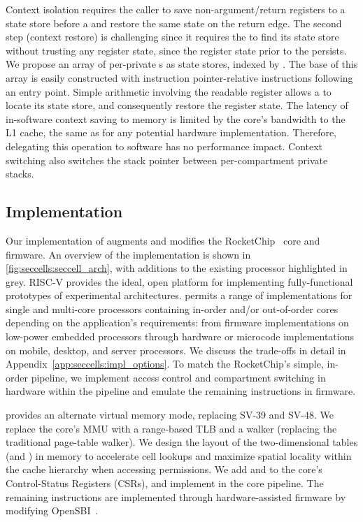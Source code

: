 Context isolation requires the caller to save non-argument/return
registers to a state store before a \sdswitch and restore the same state
on the return edge.
The second step (context restore) is challenging since it
requires the \secdiv to find its state store without trusting any
register state, since the register state prior to the \sdswitch
persists.
We propose an array of per-\secdiv private \cell{}s as 
state stores, indexed by \sid.
The base of this array is easily constructed with
instruction pointer-relative instructions following an entry point.
Simple arithmetic involving the readable \sid register allows
a \secdiv to locate its state store, and consequently restore
the register state.
The latency of in-software context saving to memory is limited by 
the core's bandwidth to the L1 cache, the same as for any potential
hardware implementation.
Therefore, delegating this operation to software has no performance
impact.
Context switching also switches the stack pointer between 
per-compartment private stacks.

\subsection{Implementation}
\label{sec:seccells:impl}

Our implementation of \seccells augments and modifies the 
RocketChip~\cite{RocketChip} core and firmware.
An overview of the implementation is shown in 
\autoref{fig:seccells:seccell_arch}, with additions to the existing
processor highlighted in grey.
RISC-V provides the ideal, open platform for implementing fully-functional
prototypes of experimental architectures. 
\seccells permits a range of implementations for single and multi-core
processors containing in-order and/or out-of-order cores depending on the 
application's requirements: from firmware implementations on 
low-power embedded processors through hardware or 
microcode implementations on mobile, desktop, and server processors.
We discuss the trade-offs in detail in Appendix~\ref{app:seccells:impl_options}.
To match the RocketChip's simple, in-order pipeline, we implement 
access control and compartment switching in hardware within the pipeline 
and emulate the remaining instructions in firmware.

\seccells provides an alternate virtual memory mode, replacing 
SV-39 and SV-48.
We replace the core's MMU with a range-based TLB and a 
\ptable walker (replacing the traditional page-table walker).
We design the layout of the two-dimensional tables (\ptable and \gtable)
in memory to accelerate cell lookups and maximize 
spatial locality within the cache hierarchy when accessing permissions.
We add \sid and \rid to the core's Control-Status Registers (CSRs), 
and implement \sdswitch in the core pipeline.
The remaining instructions are implemented through hardware-assisted firmware 
by modifying OpenSBI~\cite{OpenSBI}.

